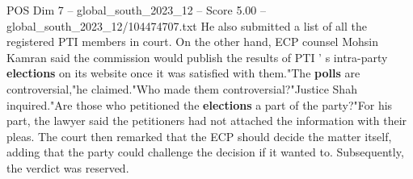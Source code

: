 \begin{textsample}{POS Dim 7 – global\_south\_2023\_12 – Score 5.00 – global\_south\_2023\_12/104474707.txt}
He also submitted a list of all the registered PTI members in court.
On the other hand, ECP counsel Mohsin Kamran said the commission would publish the results of PTI ' s intra-party \textbf{elections} on its website once it was satisfied with them."The \textbf{polls} are controversial,"he claimed."Who made them controversial?"Justice Shah inquired."Are those who petitioned the \textbf{elections} a part of the party?"For his part, the lawyer said the petitioners had not attached the information with their pleas.
The court then remarked that the ECP should decide the matter itself, adding that the party could challenge the decision if it wanted to.
Subsequently, the verdict was reserved.

\end{textsample}
